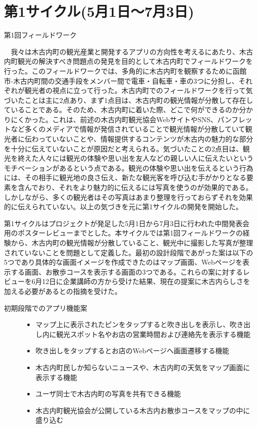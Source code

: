\section{第1サイクル(5月1日〜7月3日)}

\begin{description}
\item[第1回フィールドワーク]\mbox{}
\end{description}
　我々は木古内町の観光産業と開発するアプリの方向性を考えるにあたり、木古内町観光の解決すべき問題点の発見を目的として木古内町でフィールドワークを行った。このフィールドワークでは、多角的に木古内町を観察するために函館市-木古内町間の交通手段をメンバー間で電車・自転車・車の3つに分担し、それぞれが観光者の視点に立って行った。木古内町でのフィールドワークを行って気づいたことは主に2点あり、まず1点目は、木古内町の観光情報が分散して存在していることである。そのため、木古内町に着いた際、どこで何ができるのか分かりにくかった。これは、前述の木古内町観光協会WebサイトやSNS、パンフレットなど多くのメディアで情報が発信されていることで観光情報が分散していて観光者に伝わっていないことや、情報提供するコンテンツが木古内の魅力的な部分を十分に伝えていないことが原因だと考えられる。気づいたことの2点目は、観光を終えた人々には観光の体験や思い出を友人などの親しい人に伝えたいというモチベーションがあるという点である。観光の体験や思い出を伝えるという行為には、その相手に観光地の良さ伝え、新たな観光客を呼び込む手がかりとなる要素を含んでおり、それをより魅力的に伝えるには写真を使うのが効果的である。しかしながら、多くの観光者はその写真はあまり整理を行っておらずそれを効果的に伝えられていない。以上の気づきを元に第1サイクルの開発を開始した。

第1サイクルはプロジェクトが発足した5月1日から7月3日に行われた中間発表会用のポスターレビューまでとした。本サイクルでは第1回フィールドワークの経験から、木古内町の観光情報が分散していること、観光中に撮影した写真が整理されていないことを問題として定義した。最初の設計段階であがった案は以下の5つであり具体的な画面イメージを作成できたのはマップ画面、Webページを表示する画面、お散歩コースを表示する画面の3つである。これらの案に対するレビューを6月12日に企業講師の方から受けた結果、現在の提案に木古内らしさを加える必要があるとの指摘を受けた。
\begin{description}
\item[初期段階でのアプリ機能案]\mbox{}
\begin{itemize}
 \item マップ上に表示されたピンをタップすると吹き出しを表示し、吹き出し内に観光スポット名やお店の営業時間および連絡先を表示する機能
  \item 吹き出しをタップするとお店のWebページへ画面遷移する機能
 \item 木古内町民しか知らないニュースや、木古内町の天気をマップ画面に表示する機能
 \item ユーザ同士で木古内町の写真を共有できる機能
 \item 木古内町観光協会が公開している木古内お散歩コースをマップの中に盛り込む
\end{itemize}
\end{description}

